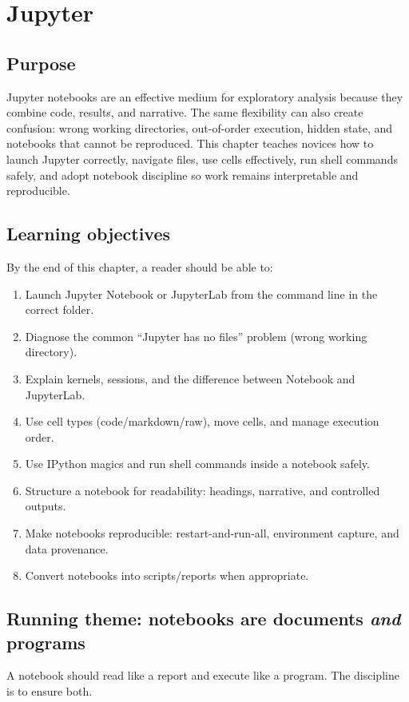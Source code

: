 \chapter{Jupyter}
\label{ch:jupyter}

\section*{Purpose}
Jupyter notebooks are an effective medium for exploratory analysis because they combine code, results, and narrative. The same flexibility can also create confusion: wrong working directories, out-of-order execution, hidden state, and notebooks that cannot be reproduced. This chapter teaches novices how to launch Jupyter correctly, navigate files, use cells effectively, run shell commands safely, and adopt notebook discipline so work remains interpretable and reproducible.

\section*{Learning objectives}
By the end of this chapter, a reader should be able to:
\begin{enumerate}
\item Launch Jupyter Notebook or JupyterLab from the command line in the correct folder.
\item Diagnose the common ``Jupyter has no files'' problem (wrong working directory).
\item Explain kernels, sessions, and the difference between Notebook and JupyterLab.
\item Use cell types (code/markdown/raw), move cells, and manage execution order.
\item Use IPython magics and run shell commands inside a notebook safely.
\item Structure a notebook for readability: headings, narrative, and controlled outputs.
\item Make notebooks reproducible: restart-and-run-all, environment capture, and data provenance.
\item Convert notebooks into scripts/reports when appropriate.
\end{enumerate}

\section*{Running theme: notebooks are documents \emph{and} programs}
A notebook should read like a report and execute like a program. The discipline is to ensure both.

